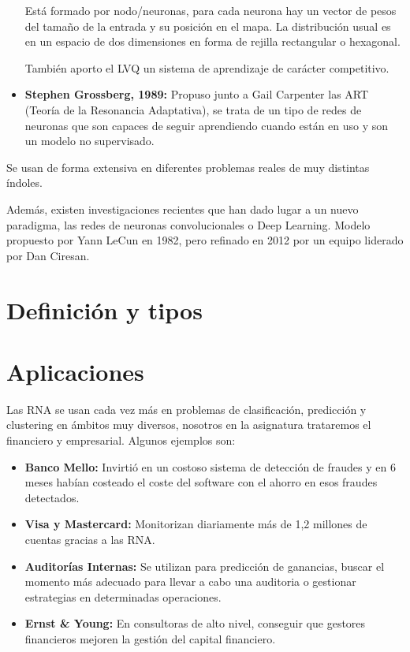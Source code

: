 \documentclass[12pt, twoside, openright]{report} %
\begin{document}
\begin{itemize}
	      Está formado por nodo/neuronas, para cada neurona hay un vector de pesos del tamaño de la entrada y su posición en el mapa. La distribución usual es en un espacio de dos dimensiones en forma de rejilla rectangular o hexagonal.
	      
	      También aporto el LVQ un sistema de aprendizaje de carácter competitivo.
	\item \textbf{Stephen Grossberg, 1989:} Propuso junto a Gail Carpenter las ART (Teoría de la Resonancia Adaptativa), se trata de un tipo de redes de neuronas que son capaces de seguir aprendiendo cuando están en uso y son un modelo no supervisado.
\end{itemize}

Se usan de forma extensiva en diferentes problemas reales de muy distintas índoles.

Además, existen investigaciones recientes que han dado lugar a un nuevo paradigma, las redes de neuronas convolucionales o Deep Learning. Modelo propuesto por Yann LeCun en 1982, pero refinado en 2012 por un equipo liderado por Dan Ciresan.

\section{Definición y tipos}


\section{Aplicaciones}
Las RNA se usan cada vez más en problemas de clasificación, predicción y clustering en ámbitos muy diversos, nosotros en la asignatura trataremos el financiero y empresarial. Algunos ejemplos son:
\begin{itemize}
	\item \textbf{Banco Mello:} Invirtió en un costoso sistema de detección de fraudes y en 6 meses habían costeado el coste del software con el ahorro en esos fraudes detectados.
	\item \textbf{Visa y Mastercard:} Monitorizan diariamente más de 1,2 millones de cuentas gracias a las RNA.
	\item \textbf{Auditorías Internas:} Se utilizan para predicción de ganancias, buscar el momento más adecuado para llevar a cabo una auditoria o gestionar estrategias en determinadas operaciones.
	\item \textbf{Ernst \& Young:} En consultoras de alto nivel, conseguir que gestores financieros mejoren la gestión del capital financiero.
\end{itemize}
\end{document}
